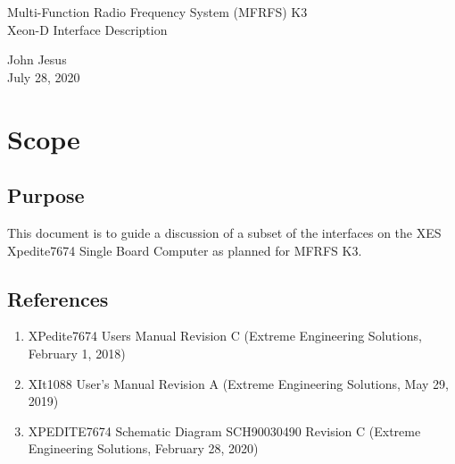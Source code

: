 \documentclass[12pt]{article}
\begin{document}
\thispagestyle{empty}
\begin{titlepage}
\begin{center}
        \vspace*{1cm}

        \LARGE{Multi-Function Radio Frequency System (MFRFS) K3 \\
            Xeon-D Interface Description}

        \vspace{0.5cm}
        \LARGE

        \vspace{1.5cm}

        \normalsize

        John Jesus \\
        July 28, 2020

        \vfill



        \vspace{0.8cm}




\end{center}
\end{titlepage}

\tableofcontents
\newpage

\section{Scope}
\subsection{Purpose}
This document is to guide a discussion of a subset of the interfaces on the XES Xpedite7674 Single Board Computer as planned for MFRFS K3.

\subsection{References}
\begin{enumerate}
    \item XPedite7674 Users Manual Revision C (Extreme Engineering Solutions, February 1, 2018) \label{ref:board_man}
    \item XIt1088 User’s Manual Revision A (Extreme Engineering Solutions, May 29, 2019) \label{ref:rtm_man}
    \item XPEDITE7674 Schematic Diagram SCH90030490 Revision C (Extreme Engineering Solutions, February 28, 2020) \label{ref:schematic}
\end{enumerate}
\end{document}
